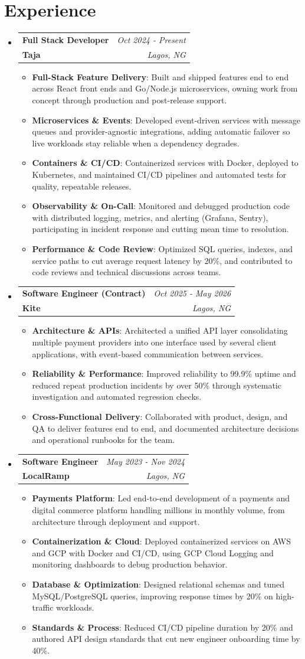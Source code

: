 \documentclass[a4paper]{article}
\makeatletter
\newcommand{\resumeItem}[2]{ \item\small{ \textbf{#1}: #2 } }
\newcommand{\resumeJobHeading}[4]{ %
\vspace{2pt}
\item[]
\begin{tabular*}{0.97\textwidth}{l@{\extracolsep{\fill}}r}
	\textbf{#1} & \textit{#3} \\
	\textbf{#4} & \textit{#2} \\
\end{tabular*}
\vspace{0pt}
}
\newcommand{\resumeSubHeadingListStart}{\begin{itemize}[leftmargin=*,topsep=1pt]}
\newcommand{\resumeSubHeadingListEnd}{\end{itemize}}
\newcommand{\resumeItemListStart}{\begin{itemize}[topsep=0pt,itemsep=0pt,parsep=0pt]}
\newcommand{\resumeItemListEnd}{\end{itemize}}
\makeatother
\begin{document}
	\vspace{4pt}
	\section{Experience}
	\resumeSubHeadingListStart
	\resumeJobHeading{Full Stack Developer}{Lagos, NG}{Oct 2024 - Present}{Taja}
	\resumeItemListStart
	\resumeItem{Full-Stack Feature Delivery}
	{Built and shipped features end to end across React front ends and Go/Node.js microservices, owning work from concept through production and post-release support.}
	\resumeItem{Microservices \& Events}
	{Developed event-driven services with message queues and provider-agnostic integrations, adding automatic failover so live workloads stay reliable when a dependency degrades.}
	\resumeItem{Containers \& CI/CD}
	{Containerized services with Docker, deployed to Kubernetes, and maintained CI/CD pipelines and automated tests for quality, repeatable releases.}
	\resumeItem{Observability \& On-Call}
	{Monitored and debugged production code with distributed logging, metrics, and alerting (Grafana, Sentry), participating in incident response and cutting mean time to resolution.}
	\resumeItem{Performance \& Code Review}
	{Optimized SQL queries, indexes, and service paths to cut average request latency by 20\%, and contributed to code reviews and technical discussions across teams.}
	\resumeItemListEnd

	\resumeJobHeading{Software Engineer (Contract)}{Lagos, NG}{Oct 2025 - May 2026}{Kite}
	\resumeItemListStart
	\resumeItem{Architecture \& APIs}
	{Architected a unified API layer consolidating multiple payment providers into one interface used by several client applications, with event-based communication between services.}
	\resumeItem{Reliability \& Performance}
{Improved reliability to 99.9\% uptime and reduced repeat production incidents by over 50\% through systematic investigation and automated regression checks.}
	\resumeItem{Cross-Functional Delivery}
	{Collaborated with product, design, and QA to deliver features end to end, and documented architecture decisions and operational runbooks for the team.}
	\resumeItemListEnd

	\resumeJobHeading{Software Engineer}{Lagos, NG}{May 2023 - Nov 2024}{LocalRamp}
	\resumeItemListStart
	\resumeItem{Payments Platform}
	{Led end-to-end development of a payments and digital commerce platform handling millions in monthly volume, from architecture through deployment and support.}
	\resumeItem{Containerization \& Cloud}
	{Deployed containerized services on AWS and GCP with Docker and CI/CD, using GCP Cloud Logging and monitoring dashboards to debug production behavior.}
	\resumeItem{Database \& Optimization}
	{Designed relational schemas and tuned MySQL/PostgreSQL queries, improving response times by 20\% on high-traffic workloads.}
	\resumeItem{Standards \& Process}
	{Reduced CI/CD pipeline duration by 20\% and authored API design standards that cut new engineer onboarding time by 40\%.}
	\resumeItemListEnd
	\resumeSubHeadingListEnd
\end{document}
